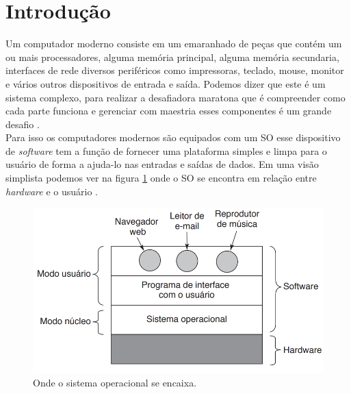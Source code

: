 
\chapter*[Introdução]{Introdução}

Um computador moderno consiste em um emaranhado de peças que contém um ou mais processadores, alguma memória principal, alguma memória secundaria, interfaces de rede diversos periféricos como impressoras, teclado, mouse, monitor e vários outros dispositivos de entrada e saída. Podemos dizer que este é um sistema complexo, para realizar a desafiadora maratona que é compreender como cada parte funciona e gerenciar com maestria esses componentes é um grande desafio \cite{Tanenbaum2016}.\\
Para isso os computadores modernos são equipados com um SO esse dispositivo de \emph{software} tem a função de fornecer uma plataforma simples e limpa para o usuário de forma a ajuda-lo nas entradas e saídas de dados. Em uma visão simplista podemos ver na figura \ref{fig:figura1} onde o SO se encontra em relação entre \emph{hardware} e o usuário \cite{Tanenbaum2016}. 

\begin{figure}[htpb]
    \centering
   \includegraphics[scale=.4]{imagens/figura1.png}
   \caption{Onde o sistema operacional se encaixa. \cite{Tanenbaum2016}}
   \label{fig:figura1}
\end{figure}


